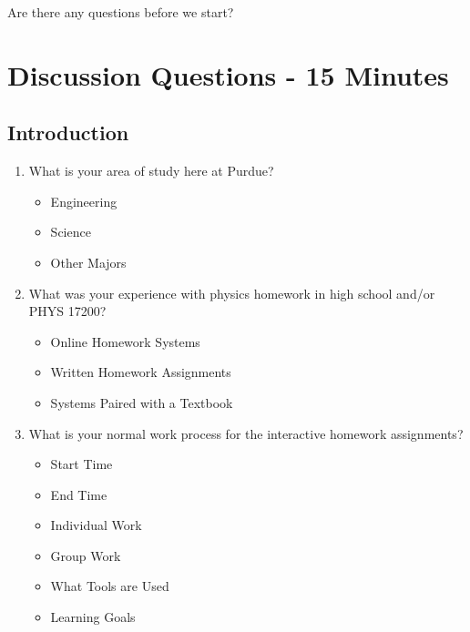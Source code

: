Are there any questions before we start?

\section{Discussion Questions - 15 Minutes}

\subsection{Introduction}
\begin{enumerate}
	\item What is your area of study here at Purdue?
	\begin{itemize}
		\item Engineering
		\item Science
		\item Other Majors
	\end{itemize}
	\item What was your experience with physics homework in high school and/or PHYS 17200?
	\begin{itemize}
		\item Online Homework Systems
		\item Written Homework Assignments
		\item Systems Paired with a Textbook
	\end{itemize}
	\item What is your normal work process for the interactive homework assignments?
	\begin{itemize}
		\item Start Time
		\item End Time
		\item Individual Work
		\item Group Work
		\item What Tools are Used
		\item Learning Goals
	\end{itemize}
\end{enumerate}

